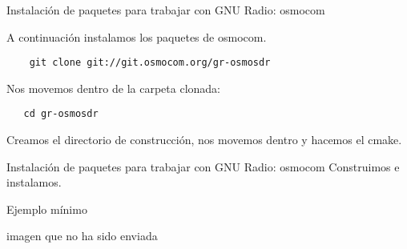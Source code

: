 \begin{frame}{Instalación de paquetes para trabajar con GNU Radio: osmocom}

A continuación instalamos los paquetes de osmocom.

\begin{block}{}
    \texttt{
    \ \ \ git clone git://git.osmocom.org/gr-osmosdr}
\end{block}

Nos movemos dentro de la carpeta clonada:

\begin{block}{}
    \texttt
    {\ \ \ cd gr-osmosdr}
\end{block}


Creamos el directorio de construcción, nos movemos dentro y hacemos el cmake.

\end{frame}

\begin{frame}{Instalación de paquetes para trabajar con GNU Radio: osmocom}
Construimos e instalamos.


\end{frame}

\begin{frame}{Ejemplo mínimo}
    \begin{center}
    \vspace{-0.3cm}
    imagen que no ha sido enviada
    \end{center}
\end{frame}




